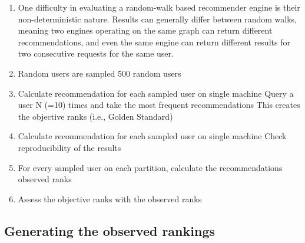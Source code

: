 \begin{enumerate}
    \item One difficulty in evaluating a random-walk based recommender engine is their non-deterministic nature. Results can generally differ between random walks, meaning two engines operating on the same graph can return different recommendations, and even the same engine can return different results for two consecutive requests for the same user.
    
    \item Random users are sampled
    500 random users 
    
    \item Calculate recommendation for each sampled user on single machine
    Query a user N (=10) times and  take the most frequent recommendations
    This creates the objective ranks (i.e., Golden Standard)
    
    \item Calculate recommendation for each sampled user on single machine
    Check reproducibility of the results
    
    \item For every sampled user on each partition, calculate the recommendations
    observed ranks
    
    \item Assess the objective ranks with the observed ranks
    
\end{enumerate}

\subsection{Generating the observed rankings}
\label{subsec:comparing-recommendtions}
